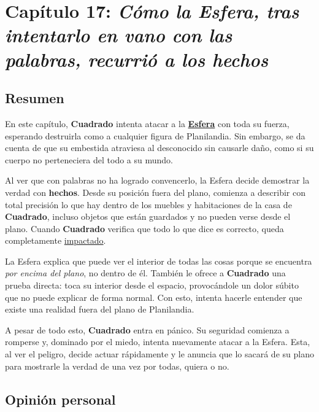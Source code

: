 \documentclass{article}
\begin{document}
\section*{\textcolor{Horizon}{Capítulo 17: \emph{Cómo la Esfera, tras intentarlo en vano con las palabras, recurrió a los hechos}}}

\subsection*{Resumen}

En este capítulo, \textbf{Cuadrado} intenta atacar a la \underline{\textbf{Esfera}} con toda su fuerza, esperando destruirla como a cualquier figura de Planilandia. Sin embargo, se da cuenta de que su embestida atraviesa al desconocido sin causarle daño, como si su cuerpo no perteneciera del todo a su mundo.

Al ver que con palabras no ha logrado convencerlo, la Esfera decide demostrar la verdad con \textbf{hechos}. Desde su posición fuera del plano, comienza a describir con total precisión lo que hay dentro de los muebles y habitaciones de la casa de \textbf{Cuadrado}, incluso objetos que están guardados y no pueden verse desde el plano. Cuando \textbf{Cuadrado} verifica que todo lo que dice es correcto, queda completamente \underline{impactado}.

La Esfera explica que puede ver el interior de todas las cosas porque se encuentra \emph{por encima del plano}, no dentro de él. También le ofrece a \textbf{Cuadrado} una prueba directa: toca su interior desde el espacio, provocándole un dolor súbito que no puede explicar de forma normal. Con esto, intenta hacerle entender que existe una realidad fuera del plano de Planilandia.

A pesar de todo esto, \textbf{Cuadrado} entra en pánico. Su seguridad comienza a romperse y, dominado por el miedo, intenta nuevamente atacar a la Esfera. Esta, al ver el peligro, decide actuar rápidamente y le anuncia que lo sacará de su plano para mostrarle la verdad de una vez por todas, quiera o no.

\subsection*{Opinión personal}
\end{document}
